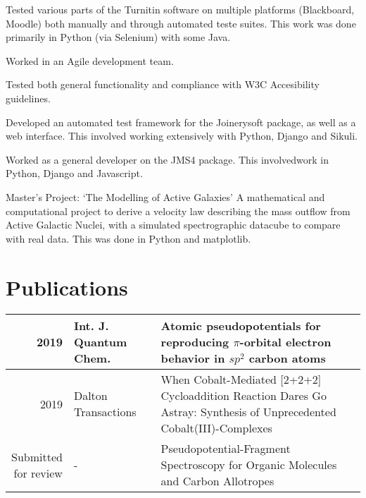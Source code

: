 \documentclass[letterpaper]{deedy-resume-openfont} %
\begin{document}
\begin{minipage}[t]{0.66\textwidth}
\begin{tightemize}
\item Tested various parts of the Turnitin software on multiple platforms (Blackboard, Moodle) both manually and through automated teste suites. This work was done primarily in Python (via Selenium) with some Java.
\item Worked in an Agile development team.
\item Tested both general functionality and compliance with W3C Accesibility guidelines. 
\end{tightemize}

\sectionspace %


\begin{tightemize}
\item Developed an automated test framework for the Joinerysoft package, as well as a web interface. This involved working extensively with Python, Django and Sikuli.
\item Worked as a general developer on the JMS4 package. This involvedwork in Python, Django and Javascript.
\end{tightemize}

\sectionspace %



\begin{tightemize}
\item Master's Project: `The Modelling of Active Galaxies' A mathematical and computational project to derive a velocity law describing the mass outflow from Active Galactic Nuclei, with a simulated spectrographic datacube to compare with real data. This was done in Python and matplotlib.
\end{tightemize}

\section{Publications} 

\begin{tabular}{rlm{7cm}}
2019 & Int. J. Quantum Chem. & Atomic pseudopotentials for reproducing $\pi$-orbital electron behavior in $sp^2$ carbon atoms \\
\hline
2019 & Dalton Transactions & When Cobalt-Mediated [2+2+2] Cycloaddition Reaction Dares Go Astray: Synthesis of Unprecedented  Cobalt(III)-Complexes \\
\hline
\makecell{Submitted \\ for review} & - & Pseudopotential-Fragment Spectroscopy for Organic Molecules and Carbon Allotropes
\end{tabular}

\sectionspace %
\end{minipage}
\end{document}
